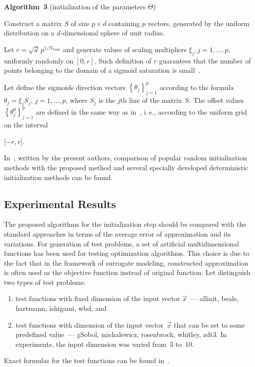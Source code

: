 \begin{multicols}{2}
\bigskip

\noindent
\textbf{Algorithm~3} (initialization of the parameters $\Theta$) %

\noindent
 \begin{enumerate}
    \item {Construct a matrix $S$ of size $p \times d$ containing $p$ vectors, generated by the uniform 
    distribution on a \mbox{$d$-dimensional} sphere of unit radius}. 
    \item {Let
      $r = \sqrt{d}\, p^{1 / N_{\mathrm{train}}}$ and generate values of scaling multipliers $\xi_j, j=1,\dots,p$, 
      uniformly randomly on $[0, r]$. Such definition of $r$ guarantees that the number of points belonging to the 
      domain of a sigmoid saturation is small~\cite{initNW}.
    \item {Let define the sigmoids direction vectors} 
    $\left\{\theta_j \right\}_{j=1}^p$ according to the formula
    $\theta_j = \xi_j S_j$, $j=1,\dots,p$, where ${S}_j$ 
    is the $j$th line of the matrix~S. The offset values 
    $\left\{\theta_j^0\right\}_{j=1}^p$ are defined in the same way as in~\cite{initNW}, 
    i.\,e., according to the uniform grid on the interval} [$-r,r$].
  \end{enumerate}

\medskip

In~\cite{itas11_Yerofeyev}, written by the present
authors, comparison of popular random initialization 
methods with the proposed method and several specially developed deterministic initialization methods 
can be found.

\subsection{Experimental Results}
\label{exp1}

\noindent
The proposed algorithms for the initialization step should be compared 
with the standard approaches in terms of the average error of approximation and its 
variations. For generation of test problems, a set of artificial multidimensional 
functions has been used for testing optimization algorithms.
This choice is due to the fact that in the framework of 
surrogate modeling, constructed approximation is often used as the 
objective function instead of original function.
Let distinguish two types of test problems:
\begin{enumerate}[(1)]
  \item test functions with fixed dimension of the input vector $\vec x$~--- 
  allinit, beale, hartmann, ishigami, wbd; and
  \item test functions with dimension of the input vector~$\vec x$ that can be 
  set to some predefined value~--- gSobol, michalewicz, rosenbrock, whitley, zdt3. 
  In experiments, the input dimension was varied from~3 to~10.
\end{enumerate}
Exact formulas for the test functions can be found in~\cite{data1, data2}.


\end{multicols}
